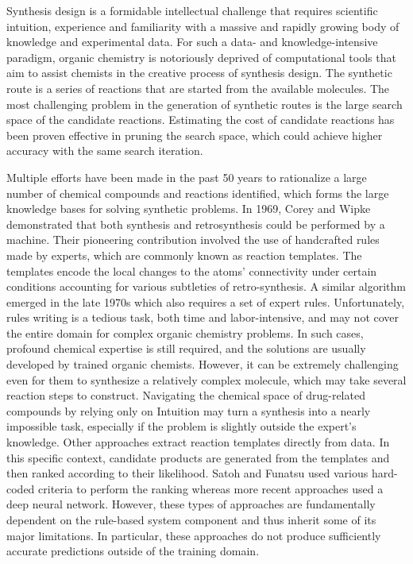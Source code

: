\documentclass[%
 aip,
 jmp,%
 amsmath,amssymb,
 reprint,%
]{revtex4-2}
\begin{document}
Synthesis design\cite{dorwald2006side} is a formidable intellectual challenge that requires scientific intuition, experience and familiarity with a massive and rapidly growing body of knowledge and experimental data. For such a data- and knowledge-intensive paradigm\cite{jamshidnezhad2023paradigm}, organic chemistry is notoriously deprived of computational tools that aim to assist chemists in the creative process of synthesis design\cite{nagai2006formaldescription}. The synthetic route is a series of reactions that are started from the available molecules. The most challenging problem in the generation of synthetic routes is the large search space of the candidate reactions. 
Estimating the cost of candidate reactions has been proven effective in pruning the search space, which could achieve higher accuracy with the same search iteration.

Multiple efforts have been made in the past 50 years to rationalize a large number of chemical compounds and reactions identified, which forms the large knowledge bases for solving synthetic problems. In 1969, Corey and Wipke\cite{corey1969computer} demonstrated that both synthesis and retrosynthesis could be performed by a machine. Their pioneering contribution involved the use of handcrafted rules made by experts, which are commonly known as reaction templates. The templates encode the local changes to the atoms' connectivity under certain conditions accounting for various subtleties of retro-synthesis. A similar algorithm emerged in the late 1970s\cite{salatin1980computer} which also requires a set of expert rules. Unfortunately, rules writing is a tedious task, both time and labor-intensive, and may not cover the entire domain for complex organic chemistry problems. In such cases, profound chemical expertise is still required, and the solutions are usually developed by trained organic chemists.
However, it can be extremely challenging even for them to synthesize a relatively complex molecule, which may take several reaction steps to construct. Navigating the chemical space of drug-related compounds by relying only on Intuition may turn a synthesis into a nearly impossible task, especially if the problem is slightly outside the expert's knowledge. Other approaches extract reaction templates directly from data. In this specific context, candidate products are generated from the templates and then ranked according to their likelihood. Satoh and Funatsu\cite{satoh1995sophia, satoh1996further} used various hard-coded criteria to perform the ranking whereas more recent approaches\cite{segler2017neural, struble2020current} used a deep neural network. However, these types of approaches are fundamentally dependent on the rule-based system component and thus inherit some of its major limitations. In particular, these approaches do not produce sufficiently accurate predictions outside of the training domain.
\end{document}
